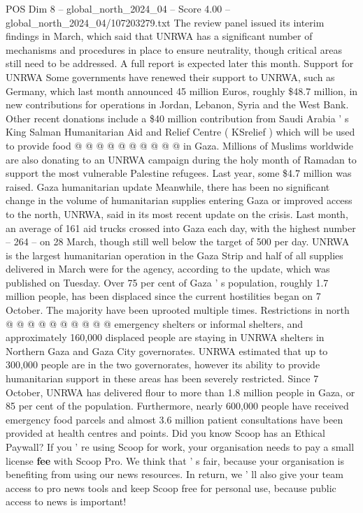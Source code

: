 \begin{textsample}{POS Dim 8 – global\_north\_2024\_04 – Score 4.00 – global\_north\_2024\_04/107203279.txt}
The review panel issued its interim findings in March, which said that UNRWA has a significant number of mechanisms and procedures in place to ensure neutrality, though critical areas still need to be addressed.
A full report is expected later this month.
Support for UNRWA Some governments have renewed their support to UNRWA, such as Germany, which last month announced 45 million Euros, roughly \$48.7 million, in new contributions for operations in Jordan, Lebanon, Syria and the West Bank.
Other recent donations include a \$40 million contribution from Saudi Arabia ' s King Salman Humanitarian Aid and Relief Centre ( KSrelief ) which will be used to provide food @ @ @ @ @ @ @ @ @ @ in Gaza.
Millions of Muslims worldwide are also donating to an UNRWA campaign during the holy month of Ramadan to support the most vulnerable Palestine refugees.
Last year, some \$4.7 million was raised.
Gaza humanitarian update Meanwhile, there has been no significant change in the volume of humanitarian supplies entering Gaza or improved access to the north, UNRWA, said in its most recent update on the crisis.
Last month, an average of 161 aid trucks crossed into Gaza each day, with the highest number -- 264 -- on 28 March, though still well below the target of 500 per day.
UNRWA is the largest humanitarian operation in the Gaza Strip and half of all supplies delivered in March were for the agency, according to the update, which was published on Tuesday.
Over 75 per cent of Gaza ' s population, roughly 1.7 million people, has been displaced since the current hostilities began on 7 October.
The majority have been uprooted multiple times.
Restrictions in north @ @ @ @ @ @ @ @ @ @ emergency shelters or informal shelters, and approximately 160,000 displaced people are staying in UNRWA shelters in Northern Gaza and Gaza City governorates.
UNRWA estimated that up to 300,000 people are in the two governorates, however its ability to provide humanitarian support in these areas has been severely restricted.
Since 7 October, UNRWA has delivered flour to more than 1.8 million people in Gaza, or 85 per cent of the population.
Furthermore, nearly 600,000 people have received emergency food parcels and almost 3.6 million patient consultations have been provided at health centres and points.
Did you know Scoop has an Ethical Paywall?
If you ' re using Scoop for work, your organisation needs to pay a small license \textbf{fee} with Scoop Pro.
We think that ' s fair, because your organisation is benefiting from using our news resources.
In return, we ' ll also give your team access to pro news tools and keep Scoop free for personal use, because public access to news is important!

\end{textsample}

